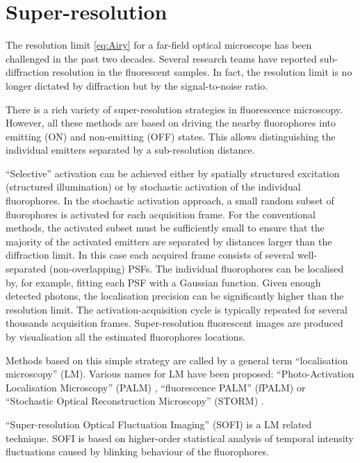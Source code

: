
\section{Super-resolution\label{sec:super-resolution}}

The resolution limit \autoref{eq:Airy} for a far-field optical microscope has been challenged in the past two decades. Several research teams have reported sub-diffraction resolution in the fluorescent samples. In fact, the resolution limit is no longer dictated by diffraction but by the signal-to-noise ratio. 

There is a rich variety of super-resolution strategies in fluorescence microscopy. However, all these methods are based on driving the nearby fluorophores into emitting (ON) and non-emitting (OFF) states. This allows distinguishing the individual emitters separated by a sub-resolution distance.

``Selective'' activation can be achieved either by spatially structured excitation (structured illumination) or by stochastic activation of the individual fluorophores. In the stochastic activation approach, a small random subset of fluorophores is activated for each acquisition frame. For the conventional methods, the activated subset must be sufficiently small to ensure that the majority of the activated emitters are separated by distances larger than the diffraction limit. In this case each acquired frame consists of several well-separated (non-overlapping) PSFs. The individual fluorophores can be localised by, for example, fitting each PSF with a Gaussian function. Given enough detected photons, the localisation precision can be significantly higher than the resolution limit. The activation-acquisition cycle is typically repeated for several thousands acquisition frames. Super-resolution fluorescent images are produced by visualisation all the estimated fluorophores locations. 

Methods based on this simple strategy are called by a general term ``localisation microscopy'' (LM). Various names for LM have been proposed: ``Photo-Activation Localisation Microscopy'' (PALM) \cite{Betzig2006}, ``fluorescence PALM'' (fPALM) \cite{Hess2006} or ``Stochastic Optical Reconstruction Microscopy'' (STORM) \cite{Rust2006}.  

``Super-resolution Optical Fluctuation Imaging'' (SOFI) \cite{Dertinger2009} is a LM related technique. SOFI is based on higher-order statistical analysis of temporal intensity fluctuations caused by blinking behaviour of the fluorophores.

